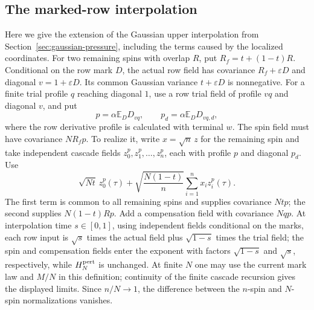 \documentclass[11pt,a4paper]{article}
\numberwithin{equation}{section}
\theoremstyle{definition}
\theoremstyle{remark}
\newcommand{\E}{\mathbb E}
\newcommand{\eps}{\varepsilon}
\begin{document}
\subsection{The marked-row interpolation}

Here we give the extension of the Gaussian upper interpolation from
Section~\ref{sec:gaussian-pressure}, including the terms caused by the
localized coordinates.  For two remaining spins with overlap $R$, put
$R_f=t+(1-t)R$.  Conditional on the row mark $D$, the actual row field
has covariance $R_f+\eps D$ and diagonal
$v=1+\eps D$.  Its common Gaussian variance $t+\eps D$ is nonnegative.
For a finite trial profile $q$ reaching diagonal $1$, use a row trial
field of profile $vq$ and diagonal $v$, and put
\[
 p=\alpha\E_D D_{vq},\qquad
 p_d=\alpha\E_D D_{vq,d},
\]
where the row derivative profile is calculated with terminal $w$.
The spin field must have covariance $NR_fp$. To realize it, write
$x=\sqrt n\,z$ for the remaining spin and take independent cascade fields
$z_0^p,z_1^p,\ldots,z_n^p$, each with profile $p$ and diagonal $p_d$.
Use
\[
 \sqrt{Nt}\,z_0^p(\tau)
 +\sqrt{\frac{N(1-t)}n}\sum_{i=1}^n x_i z_i^p(\tau).
\]
The first term is common to all remaining spins and supplies covariance
$Ntp$; the second supplies $N(1-t)Rp$. Add a compensation field with
covariance $Nqp$.  At interpolation time $s\in[0,1]$, using
independent fields conditional on the marks, each row input is $\sqrt{s}$
times the actual field plus $\sqrt{1-s}$ times the trial field; the spin
and compensation fields enter the exponent with factors $\sqrt{1-s}$
and $\sqrt{s}$, respectively, while $H_N^{\rm pert}$ is unchanged.
At finite $N$ one may use the current mark
law and $M/N$ in this definition; continuity of the finite cascade
recursion gives the displayed limits.  Since $n/N\to1$, the difference
between the $n$-spin and $N$-spin normalizations vanishes.
\end{document}
